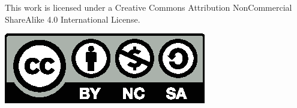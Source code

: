 \begin{center}
\begin{minipage}{0.8\textwidth}
\begin{center}
\vspace{240pt}

This work is licensed under a Creative Commons Attribution NonCommercial ShareAlike 4.0 International License.

\vspace{12pt}

\includegraphics[scale=0.8]{src/ring/gfx/by-nc-sa.eps}
\end{center}
\end{minipage}
\end{center}
